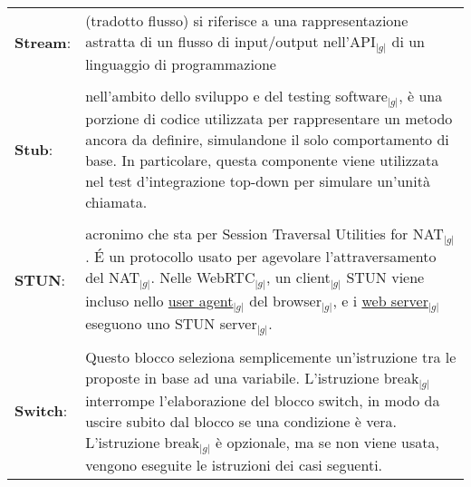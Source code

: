 \begin{longtable}{p{} p{}}
	    \\
	    \textbf{Stream}:			&	(tradotto flusso) si riferisce a una rappresentazione astratta di un flusso di input/output nell'API$_{|g|}$ di un linguaggio di programmazione\\
	    \\
	    \textbf{Stub}:			&	nell’ambito dello sviluppo e del testing software$_{|g|}$, è una porzione di codice utilizzata per rappresentare un metodo ancora da definire, simulandone il solo comportamento di base.
							In particolare, questa componente viene utilizzata nel test d'integrazione top-down per simulare un'unità chiamata.\\
	    \\
	    \textbf{STUN}: 			&	acronimo che sta per Session Traversal Utilities for NAT$_{|g|}$. \'E un protocollo usato per agevolare l’attraversamento del NAT$_{|g|}$. Nelle WebRTC$_{|g|}$, un client$_{|g|}$ STUN 
							viene incluso nello \underline{user agent}$_{|g|}$ del browser$_{|g|}$, 
							e i \underline{web server}$_{|g|}$ eseguono uno STUN server$_{|g|}$.\\
	    \\
	    \textbf{Switch}:			&	Questo blocco seleziona semplicemente un'istruzione tra le proposte in base ad una variabile. L'istruzione break$_{|g|}$ 
							interrompe l'elaborazione del blocco switch, in modo da uscire subito dal blocco se una condizione è vera. L'istruzione 
							break$_{|g|}$ è opzionale, ma se non viene usata, vengono eseguite le istruzioni dei casi seguenti.\\
	\end{longtable}
\newpage


